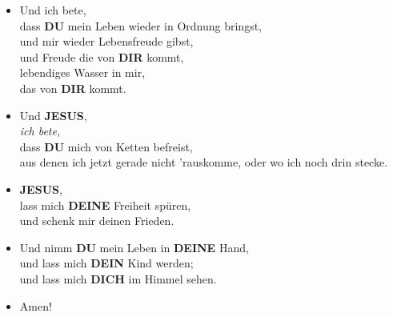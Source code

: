 \documentclass[10pt,a5paper]{article}
\newcommand{\Deine}[0]{\textbf{DEINE}}
\newcommand{\Dein}[0]{\textbf{DEIN}}
\newcommand{\Dich}[0]{\textbf{DICH}}
\newcommand{\Dir}[0]{\textbf{DIR}}
\newcommand{\Du}[0]{\textbf{DU}}
\newcommand{\Jesus}[0]{\textbf{JESUS}}
\begin{document}
\begin{itemize}[nosep]
					\\
					und f\"ur {\Dein} Reich am besten ist.
			\item	Und ich bete,
					\\
					dass {\Du} mein Leben wieder in Ordnung bringst,
					\\
					und mir wieder Lebensfreude gibst,
					\\
					und Freude die von {\Dir} kommt,
					\\
					lebendiges Wasser in mir,
					\\
					das von {\Dir} kommt.
			\item	Und {\Jesus},
					\\
					\textit{ich bete,}
					\\
					dass {\Du} mich von Ketten befreist,
					\\
					aus denen ich jetzt gerade nicht 'rauskomme,
					oder wo ich noch drin stecke.
			\item	{\Jesus},
					\\
					lass mich {\Deine} Freiheit spüren,
					\\
					und schenk mir deinen Frieden.
			\item	Und nimm {\Du} mein Leben in {\Deine} Hand,
					\\
					und lass mich {\Dein} Kind werden;
					\\
					und lass mich {\Dich} im Himmel sehen.
			\item	Amen!
		\end{itemize}
		
\end{document}
